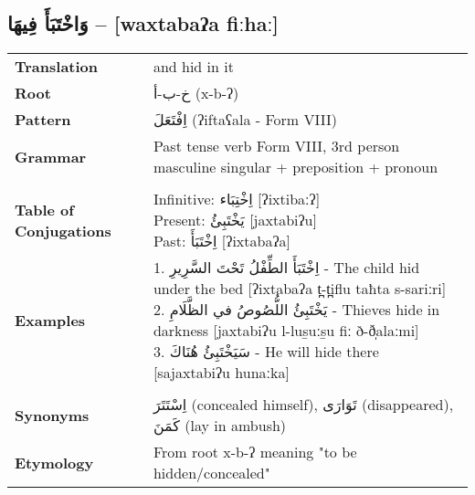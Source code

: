 \documentclass[letter,12pt]{article}
\begin{document}
\subsection{\textarabic{وَاخْتَبَأَ فِيهَا} – [waxtabaʔa fiːhaː]}
\begin{tabular}{p{3cm}p{10cm}}
\toprule
\textbf{Translation} & and hid in it \\
\textbf{Root} & \textarabic{خ-ب-أ} (x-b-ʔ) \\
\textbf{Pattern} & \textarabic{اِفْتَعَلَ} (ʔiftaʕala - Form VIII) \\
\textbf{Grammar} & Past tense verb Form VIII, 3rd person masculine singular + preposition + pronoun \\
\midrule \\
\textbf{Table of Conjugations} & \makecell[l]{
Infinitive: \textarabic{اِخْتِبَاء} [ʔixtibaːʔ] \\
Present: \textarabic{يَخْتَبِئُ} [jaxtabiʔu] \\
Past: \textarabic{اِخْتَبَأَ} [ʔixtabaʔa]
} \\
\midrule
\textbf{Examples} & \makecell[l]{\parbox{9.5cm}{
1. \textarabic{اِخْتَبَأَ الطِّفْلُ تَحْتَ السَّرِيرِ} - The child hid under the bed [ʔixtabaʔa t̪-t̪iflu taħta s-sariːri]\\
2. \textarabic{يَخْتَبِئُ اللُّصُوصُ في الظَّلَامِ} - Thieves hide in darkness [jaxtabiʔu l-lus̱uːs̱u fiː ð-ð̩alaːmi]\\
3. \textarabic{سَيَخْتَبِئُ هُنَاكَ} - He will hide there [sajaxtabiʔu hunaːka]
}} \\
\midrule \\
\textbf{Synonyms} & \textarabic{اِسْتَتَرَ} (concealed himself), \textarabic{تَوَارَى} (disappeared), \textarabic{كَمَنَ} (lay in ambush) \\
\textbf{Etymology} & From root x-b-ʔ meaning "to be hidden/concealed" \\
\bottomrule
\end{tabular}

\end{document}
